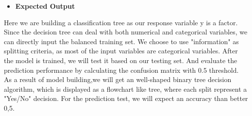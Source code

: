 	 \begin{itemize}
		\item \textbf{Expected Output}
	 \end{itemize}
 	\indent Here we are building a classification tree as our response variable y is a factor. Since the decision tree can deal with both numerical and categorical variables, we can directly input the balanced training set. We choose to use "information" as splitting criteria, as most of the input variables are categorical variables. After the model is trained, we will test it based on our testing set. And evaluate the prediction performance by calculating the confusion matrix with 0.5 threshold.\\
 	[\baselineskip]\noindent  As a result of model building,we will get an well-shaped binary tree decision algorithm, which is displayed as a flowchart like tree, where each split represent a "Yes/No" decision. For the prediction test, we will expect an accuracy than better 0,5.
 
